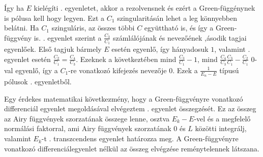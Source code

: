 
Így ha $E$ kielégíti . egyenletet, akkor a rezolvensnek és ezért a Green-függénynek is pólusa kell hogy legyen. Ezt a $C_1$ szingularitásán lehet a leg könnyebben belátni. Ha $C_1$ szinguláris, az összes többi $C$ együttható is, és így a Green-függvény is. . egyenlet szerint a $\frac{C_3}{C_1}$ számlálójának és nevezőének ,ásodik tagjai egyenlőek. Első tagjuk bármely $E$ esetén egyenlő, így  hányadosuk $1$, valamint . egyenlet esetén $\frac{C_2}{C_1} = \frac{C_4}{C_3}$. Ezeknek a következtében mind $\frac{C_3}{C_1} - 1$, mind $\frac{C_4}{C_3}\frac{C_3}{C_1} - \frac{C_2}{C_1}$ $0$-val egyenlő, így a $C_1$-re vonatkozó kifejezés nevezője $0$. Ezek a $\frac{1}{E_n - E}$ típusú pólusok . egyenletből.

Egy érdekes matematikai következmény, hogy a Green-függvényre vonatkozó differenciál egyenlet megoldásával elvégeztem . egyenlet összegzését. Ez az összeg az Airy függvények szorzatának összege lenne, osztva $E_k-E$-vel és a megfelelő normálási faktorral, ami Airy függvények szorzatának $0$ és $L$ közötti integrálj, valamint $E_k$-t . transzcendens egyenlet határozza meg. A Green-függvényre vonatkozó differenciálegyenlet nélkül az összeg elvégzése reménytelennek látszana.